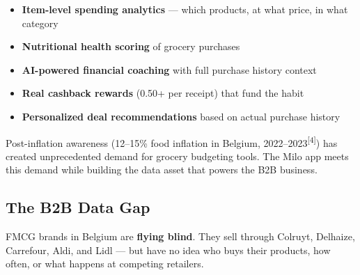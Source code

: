 \documentclass[11pt,a4paper]{article}
\begin{document}
\begin{itemize}[leftmargin=1.5em, itemsep=3pt]
  \item \textbf{Item-level spending analytics} --- which products, at what price, in what category
  \item \textbf{Nutritional health scoring} of grocery purchases
  \item \textbf{AI-powered financial coaching} with full purchase history context
  \item \textbf{Real cashback rewards} (\texteuro{}0.50+ per receipt) that fund the habit
  \item \textbf{Personalized deal recommendations} based on actual purchase history
\end{itemize}

Post-inflation awareness (12--15\% food inflation in Belgium, 2022--2023\textsuperscript{[4]}) has created unprecedented demand for grocery budgeting tools. The Milo app meets this demand while building the data asset that powers the B2B business.

\subsection{The B2B Data Gap}

FMCG brands in Belgium are \textbf{flying blind}. They sell through Colruyt, Delhaize, Carrefour, Aldi, and Lidl --- but have no idea who buys their products, how often, or what happens at competing retailers.
\end{document}
